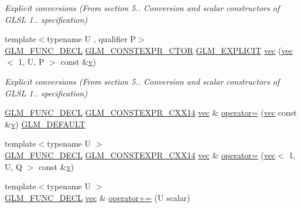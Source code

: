\begin{DoxyCompactItemize}
\begin{DoxyCompactList}\small\item\em Explicit conversions (From section 5.. Conversion and scalar constructors of G\+L\+SL 1.. specification) \end{DoxyCompactList}\item 
{\footnotesize template$<$typename U , qualifier P$>$ }\\\hyperlink{setup_8hpp_ab2d052de21a70539923e9bcbf6e83a51}{G\+L\+M\+\_\+\+F\+U\+N\+C\+\_\+\+D\+E\+CL} \hyperlink{setup_8hpp_ad34178a09666081abdb573c14d1f4a5a}{G\+L\+M\+\_\+\+C\+O\+N\+S\+T\+E\+X\+P\+R\+\_\+\+C\+T\+OR} \hyperlink{setup_8hpp_a6c74f5a5e7b134ab69023ff9a30d4d5d}{G\+L\+M\+\_\+\+E\+X\+P\+L\+I\+C\+IT} \hyperlink{structglm_1_1vec_3_011_00_01_t_00_01_q_01_4_abd93e6bf42d506d85f4aea0c5d92ecc2}{vec} (\hyperlink{structglm_1_1vec}{vec}$<$ 1, U, P $>$ const \&\hyperlink{_s_d_l__opengl_8h_a10a82eabcb59d2fcd74acee063775f90}{v})
\begin{DoxyCompactList}\small\item\em Explicit conversions (From section 5.. Conversion and scalar constructors of G\+L\+SL 1.. specification) \end{DoxyCompactList}\item 
\hyperlink{setup_8hpp_ab2d052de21a70539923e9bcbf6e83a51}{G\+L\+M\+\_\+\+F\+U\+N\+C\+\_\+\+D\+E\+CL} \hyperlink{setup_8hpp_a4dd12abf5e1164bc57f3a34671d03844}{G\+L\+M\+\_\+\+C\+O\+N\+S\+T\+E\+X\+P\+R\+\_\+\+C\+X\+X14} \hyperlink{structglm_1_1vec}{vec} \& \hyperlink{structglm_1_1vec_3_011_00_01_t_00_01_q_01_4_ac0ab0e9e96caa507674d12526367ea11}{operator=} (\hyperlink{structglm_1_1vec}{vec} const \&\hyperlink{_s_d_l__opengl_8h_a10a82eabcb59d2fcd74acee063775f90}{v}) \hyperlink{setup_8hpp_aefce7051c376a64ba89fa93a9f63bc2c}{G\+L\+M\+\_\+\+D\+E\+F\+A\+U\+LT}
\item 
{\footnotesize template$<$typename U $>$ }\\\hyperlink{setup_8hpp_ab2d052de21a70539923e9bcbf6e83a51}{G\+L\+M\+\_\+\+F\+U\+N\+C\+\_\+\+D\+E\+CL} \hyperlink{setup_8hpp_a4dd12abf5e1164bc57f3a34671d03844}{G\+L\+M\+\_\+\+C\+O\+N\+S\+T\+E\+X\+P\+R\+\_\+\+C\+X\+X14} \hyperlink{structglm_1_1vec}{vec} \& \hyperlink{structglm_1_1vec_3_011_00_01_t_00_01_q_01_4_a2ebfdb3250071dc75ee92e29fbbf0062}{operator=} (\hyperlink{structglm_1_1vec}{vec}$<$ 1, U, Q $>$ const \&\hyperlink{_s_d_l__opengl_8h_a10a82eabcb59d2fcd74acee063775f90}{v})
\item 
{\footnotesize template$<$typename U $>$ }\\\hyperlink{setup_8hpp_ab2d052de21a70539923e9bcbf6e83a51}{G\+L\+M\+\_\+\+F\+U\+N\+C\+\_\+\+D\+E\+CL} \hyperlink{structglm_1_1vec}{vec} \& \hyperlink{structglm_1_1vec_3_011_00_01_t_00_01_q_01_4_acdec3852ebe81329d4c52d4cf5a15a9e}{operator+=} (U scalar)

\end{DoxyCompactItemize}
